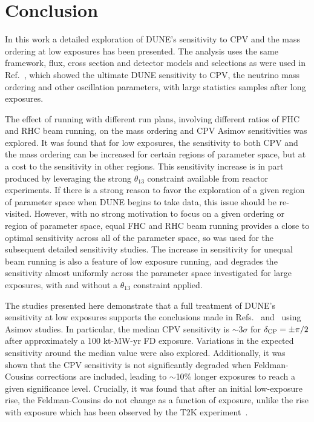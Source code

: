 \section{Conclusion}
\label{sec:conclude}

In this work a detailed exploration of DUNE's sensitivity to CPV and the mass ordering at low exposures has been presented. The analysis uses the same framework, flux, cross section and detector models and selections as were used in Ref.~\cite{Abi:2020qib}, which showed the ultimate DUNE sensitivity to CPV, the neutrino mass ordering and other oscillation parameters, with large statistics samples after long exposures.

The effect of running with different run plans, involving different ratios of FHC and RHC beam running, on the mass ordering and CPV Asimov sensitivities was explored. It was found that for low exposures, the sensitivity to both CPV and the mass ordering can be increased for certain regions of parameter space, but at a cost to the sensitivity in other regions. This sensitivity increase is in part produced by leveraging the strong $\theta_{13}$ constraint available from reactor experiments. If there is a strong reason to favor the exploration of a given region of parameter space when DUNE begins to take data, this issue should be re-visited. However, with no strong motivation to focus on a given ordering or region of \deltacp parameter space, equal FHC and RHC beam running provides a close to optimal sensitivity across all of the parameter space, so was used for the subsequent detailed sensitivity studies. The increase in sensitivity for unequal beam running is also a feature of low exposure running, and degrades the sensitivity almost uniformly across the parameter space investigated for large exposures, with and without a $\theta_{13}$ constraint applied.

The studies presented here demonstrate that a full treatment of DUNE's sensitivity at low exposures supports the conclusions made in Refs.~\cite{Abi:2020qib} and~\cite{Abi:2020evt} using Asimov studies. In particular, the median CPV sensitivity is $\sim$3$\sigma$ for $\delta_{\rm CP} = \pm\pi/2$ after approximately a 100 kt-MW-yr FD exposure. Variations in the expected sensitivity around the median value were also explored. Additionally, it was shown that the CPV sensitivity is not significantly degraded when Feldman-Cousins corrections are included, leading to $\sim$10\% longer exposures to reach a given significance level. Crucially, it was found that after an initial low-exposure rise, the Feldman-Cousins \dchisqcrit do not change as a function of exposure, unlike the rise with exposure which has been observed by the T2K experiment~\cite{Abe:2021gky}.

